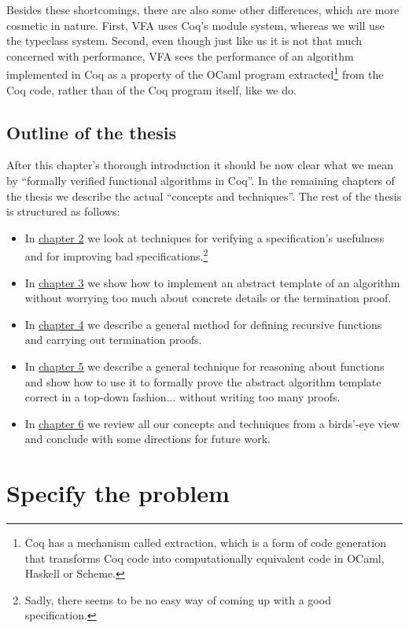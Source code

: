 \documentclass[declaration,mgr,english,shortabstract]{iithesis}
\begin{document}
Besides these shortcomings, there are also some other differences, which are more cosmetic in nature. First, VFA uses Coq's module system, whereas we will use the typeclass system. Second, even though just like us it is not that much concerned with performance, VFA sees the performance of an algorithm implemented in Coq as a property of the OCaml program extracted\footnote{Coq has a mechanism called extraction, which is a form of code generation that transforms Coq code into computationally equivalent code in OCaml, Haskell or Scheme.} from the Coq code, rather than of the Coq program itself, like we do.

\section{Outline of the thesis} \label{outline}

After this chapter's thorough introduction it should be now clear what we mean by ``formally verified functional algorithms in Coq''. In the remaining chapters of the thesis we describe the actual ``concepts and techniques''. The rest of the thesis is structured as follows:

\begin{itemize}
    \setlength\itemsep{0em}
    \item In \hyperref[specify]{chapter 2} we look at techniques for verifying a specification's usefulness and for improving bad specifications.\footnote{Sadly, there seems to be no easy way of coming up with a good specification.}
    \item In \hyperref[template]{chapter 3} we show how to implement an abstract template of an algorithm without worrying too much about concrete details or the termination proof.
    \item In \hyperref[termination]{chapter 4} we describe a general method for defining recursive functions and carrying out termination proofs.
    \item In \hyperref[exnihilo]{chapter 5} we describe a general technique for reasoning about functions and show how to use it to formally prove the abstract algorithm template correct in a top-down fashion... without writing too many proofs.
    \item In \hyperref[conclusion]{chapter 6} we review all our concepts and techniques from a birds'-eye view and conclude with some directions for future work.
\end{itemize}

\chapter{Specify the problem} \label{specify}
\end{document}
